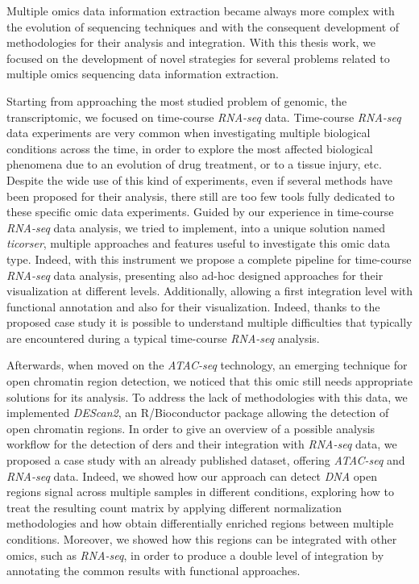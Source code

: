 Multiple omics data information extraction became always more complex with the evolution of sequencing techniques and with the consequent development of methodologies for their analysis and integration.
With this thesis work, we focused on the development of novel strategies for several problems related to multiple omics sequencing data information extraction.

Starting from approaching the most studied problem of genomic, the transcriptomic, we focused on time-course \textit{RNA-seq} data.
Time-course \textit{RNA-seq} data experiments are very common when investigating multiple biological conditions across the time, in order to explore the most affected biological phenomena due to an evolution of drug treatment, or to a tissue injury, etc.
Despite the wide use of this kind of experiments, even if several methods have been proposed for their analysis, there still are too few tools fully dedicated to these specific omic data experiments.
Guided by our experience in time-course \textit{RNA-seq} data analysis, we tried to implement, into a unique solution named \textit{ticorser}, multiple approaches and features useful to investigate this omic data type.
Indeed, with this instrument we propose a complete pipeline for time-course \textit{RNA-seq} data analysis, presenting also ad-hoc designed approaches for their visualization at different levels.
Additionally, allowing a first integration level with functional annotation and also for their visualization.
Indeed, thanks to the proposed case study it is possible to understand multiple difficulties that typically are encountered during a typical time-course \textit{RNA-seq} analysis.

Afterwards, when moved on the \textit{ATAC-seq} technology, an emerging technique for open chromatin region detection, we noticed that this omic still needs appropriate solutions for its analysis.
To address the lack of methodologies with this data, we implemented \textit{DEScan2}, an R/Bioconductor package allowing the detection of open chromatin regions.
In order to give an overview of a possible analysis workflow for the detection of \glspl{der} and their integration with \textit{RNA-seq} data, we proposed a case study with an already published dataset, offering \textit{ATAC-seq} and \textit{RNA-seq} data.
Indeed, we showed how our approach can detect \textit{DNA} open regions signal across multiple samples in different conditions, exploring how to treat the resulting count matrix by applying different normalization methodologies and how obtain differentially enriched regions between multiple conditions.
Moreover, we showed how this regions can be integrated with other omics, such as \textit{RNA-seq}, in order to produce a double level of integration by annotating the common results with functional approaches.

